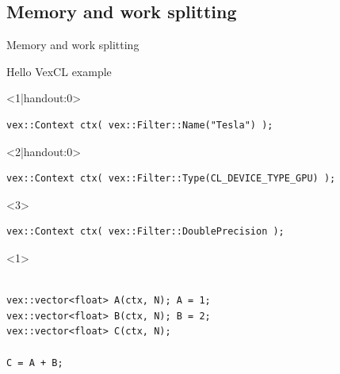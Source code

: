 \documentclass[@BEAMER_OPTIONS@]{beamer}
\begin{document}
\subsection{Memory and work splitting}

\begin{frame}[fragile]{Memory and work splitting}
    \begin{exampleblock}{Hello VexCL example}
        \begin{onlyenv}<1|handout:0>
        \begin{lstlisting}[escapechar=!]
vex::Context ctx( vex::Filter::Name("Tesla") );
        \end{lstlisting}
        \end{onlyenv}
        \begin{onlyenv}<2|handout:0>
        \begin{lstlisting}[escapechar=!]
vex::Context ctx( vex::Filter::Type(CL_DEVICE_TYPE_GPU) );
        \end{lstlisting}
        \end{onlyenv}
        \begin{onlyenv}<3>
        \begin{lstlisting}[escapechar=!]
vex::Context ctx( vex::Filter::DoublePrecision );
        \end{lstlisting}
        \end{onlyenv}
        \begin{uncoverenv}<1>
        \begin{lstlisting}[firstnumber=last]

vex::vector<float> A(ctx, N); A = 1;
vex::vector<float> B(ctx, N); B = 2;
vex::vector<float> C(ctx, N);

C = A + B;
        \end{lstlisting}
        \end{uncoverenv}
    \end{exampleblock}
    \begin{figure}
\end{figure}
\end{frame}
\end{document}
